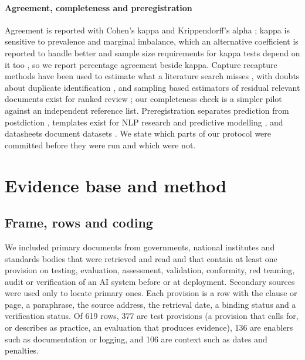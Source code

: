 \documentclass[conference]{IEEEtran}
\begin{document}
\paragraph{Agreement, completeness and preregistration} Agreement is reported with Cohen's kappa \citep{mchugh2012interrater} and Krippendorff's alpha \citep{krippendorff2011computing}; kappa is sensitive to prevalence and marginal imbalance, which an alternative coefficient is reported to handle better \citep{wongpakaran2013comparison} and sample size requirements for kappa tests depend on it too \citep{bujang2017guidelines}, so we report percentage agreement beside kappa. Capture recapture methods have been used to estimate what a literature search misses \citep{spoor1996use,kastner2009capture,stelfox2013capture}, with doubts about duplicate identification \citep{motschall2009number}, and sampling based estimators of residual relevant documents exist for ranked review \citep{li2020stop}; our completeness check is a simpler pilot against an independent reference list. Preregistration separates prediction from postdiction \citep{nosek2018preregistration}, templates exist for NLP research and predictive modelling \citep{vanmiltenburg2021preregistering,hofman2023preregistration}, and datasheets document datasets \citep{gebru2021datasheets}. We state which parts of our protocol were committed before they were run and which were not.

\section{Evidence base and method}\label{sec:method}
\subsection{Frame, rows and coding}
We included primary documents from governments, national institutes and standards bodies that were retrieved and read and that contain at least one provision on testing, evaluation, assessment, validation, conformity, red teaming, audit or verification of an AI system before or at deployment. Secondary sources were used only to locate primary ones. Each provision is a row with the clause or page, a paraphrase, the source address, the retrieval date, a binding status and a verification status. Of 619 rows, 377 are test provisions (a provision that calls for, or describes as practice, an evaluation that produces evidence), 136 are enablers such as documentation or logging, and 106 are context such as dates and penalties.
\end{document}
